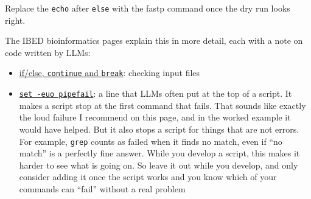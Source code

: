 \documentclass[
  letterpaper,
  DIV=11,
  numbers=noendperiod]{scrreprt}
\providecommand{\tightlist}{%
  \setlength{\itemsep}{0pt}\setlength{\parskip}{0pt}}
\begin{document}
\begin{tcolorbox}
Replace the \texttt{echo} after \texttt{else} with the fastp command
once the dry run looks right.

The IBED bioinformatics pages explain this in more detail, each with a
note on code written by LLMs:

\begin{itemize}
\tightlist
\item
  \href{https://scienceparkstudygroup.github.io/ibed-bioinformatics-page/source/core_tools/bash-input-validation.html}{if/else,
  \texttt{continue} and \texttt{break}}: checking input files
\item
  \href{https://scienceparkstudygroup.github.io/ibed-bioinformatics-page/source/core_tools/bash-pipefail.html}{\texttt{set\ -euo\ pipefail}}:
  a line that LLMs often put at the top of a script. It makes a script
  stop at the first command that fails. That sounds like exactly the
  loud failure I recommend on this page, and in the worked example it
  would have helped. But it also stops a script for things that are not
  errors. For example, \texttt{grep} counts as failed when it finds no
  match, even if ``no match'' is a perfectly fine answer. While you
  develop a script, this makes it harder to see what is going on. So
  leave it out while you develop, and only consider adding it once the
  script works and you know which of your commands can ``fail'' without
  a real problem
\end{itemize}

\end{tcolorbox}
\end{document}
